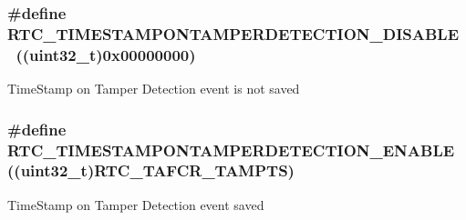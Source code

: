 \subsubsection[{\texorpdfstring{R\+T\+C\+\_\+\+T\+I\+M\+E\+S\+T\+A\+M\+P\+O\+N\+T\+A\+M\+P\+E\+R\+D\+E\+T\+E\+C\+T\+I\+O\+N\+\_\+\+D\+I\+S\+A\+B\+LE}{RTC_TIMESTAMPONTAMPERDETECTION_DISABLE}}]{\setlength{\rightskip}{0pt plus 5cm}\#define R\+T\+C\+\_\+\+T\+I\+M\+E\+S\+T\+A\+M\+P\+O\+N\+T\+A\+M\+P\+E\+R\+D\+E\+T\+E\+C\+T\+I\+O\+N\+\_\+\+D\+I\+S\+A\+B\+LE~((uint32\+\_\+t)0x00000000)}\hypertarget{group___r_t_c_ex___tamper___time_stamp_on_tamper_detection___definitions_ga11e98cb1fff680cf391398c40925f891}{}\label{group___r_t_c_ex___tamper___time_stamp_on_tamper_detection___definitions_ga11e98cb1fff680cf391398c40925f891}
Time\+Stamp on Tamper Detection event is not saved 
\subsubsection[{\texorpdfstring{R\+T\+C\+\_\+\+T\+I\+M\+E\+S\+T\+A\+M\+P\+O\+N\+T\+A\+M\+P\+E\+R\+D\+E\+T\+E\+C\+T\+I\+O\+N\+\_\+\+E\+N\+A\+B\+LE}{RTC_TIMESTAMPONTAMPERDETECTION_ENABLE}}]{\setlength{\rightskip}{0pt plus 5cm}\#define R\+T\+C\+\_\+\+T\+I\+M\+E\+S\+T\+A\+M\+P\+O\+N\+T\+A\+M\+P\+E\+R\+D\+E\+T\+E\+C\+T\+I\+O\+N\+\_\+\+E\+N\+A\+B\+LE~((uint32\+\_\+t)R\+T\+C\+\_\+\+T\+A\+F\+C\+R\+\_\+\+T\+A\+M\+P\+TS)}\hypertarget{group___r_t_c_ex___tamper___time_stamp_on_tamper_detection___definitions_ga5954385741ff0e2b250438c493bc0e36}{}\label{group___r_t_c_ex___tamper___time_stamp_on_tamper_detection___definitions_ga5954385741ff0e2b250438c493bc0e36}
Time\+Stamp on Tamper Detection event saved 